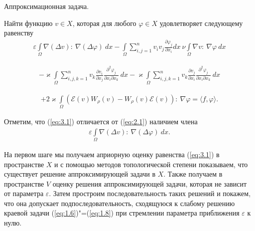 Аппроксимационная задача.

Найти функцию $v \in X$, которая для любого $\varphi \in X$ удовлетворяет следующему равенству
\begin{equation*}
    \begin{gathered}
        \varepsilon \int\limits_\Omega \nabla(\Delta v): \ \nabla(\Delta\varphi) \ dx -
        \int\limits_\Omega \sum_{i,j=1}^n v_i v_j \frac{\partial \varphi_j}{\partial x_i} dx \ \nu
        \int\limits_\Omega \nabla v: \ \nabla \varphi \ dx
    \end{gathered}
\end{equation*}

\begin{equation*}
    \begin{gathered}
        - \varkappa \int\limits_\Omega \sum_{i,j,k=1}^n v_k \frac{\partial v_i}{\partial x_j}
        \frac{\partial^2 \varphi_j}{\partial x_i \partial x_k} \ dx
        - \varkappa \int\limits_\Omega \sum_{i,j,k=1}^n v_k \frac{\partial v_j}{\partial x_i}
        \frac{\partial^2 \varphi_j}{\partial x_i \partial x_k} \ dx
    \end{gathered}
\end{equation*}

\begin{equation}\label{eq:3.1}
    \begin{gathered}
        + 2 \varkappa \int\limits_\Omega (\mathcal{E}(v) W_\rho (v) - W_\rho (v) \mathcal{E}(v)): \ \nabla \varphi
        = \langle f, \varphi \rangle.
    \end{gathered}
\end{equation}

Отметим, что (\ref{eq:3.1}) отличается от (\ref{eq:2.1}) наличием члена
\begin{equation*}
    \begin{gathered}
        \varepsilon \int\limits_\Omega \nabla(\Delta v): \ \nabla(\Delta\varphi) \ dx.
    \end{gathered}
\end{equation*}

На первом шаге мы получаем априорную оценку равенства (\ref{eq:3.1}) в пространстве $X$
и с помощью методов топологической степени показываем, что существует решение аппроксимирующей задачи в $X$.
Также получаем в пространстве $V$ оценку решения аппроксимирующей задачи, которая не зависит от параметра $\varepsilon$.
Затем простроим последовательность таких решений и покажем, что она допускает подпоследовательность,
сходящуюся к слабому решению краевой задачи (\ref{eq:1.6})"=(\ref{eq:1.8}) при стремлении параметра приближения $\varepsilon$ к нулю. 

